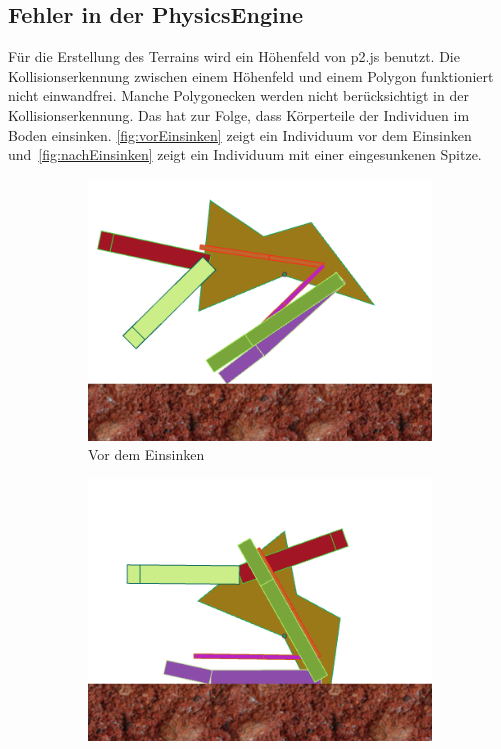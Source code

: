     \subsection{Fehler in der \gls{PhysicsEngine}}

      Für die Erstellung des Terrains wird ein Höhenfeld von p2.js benutzt.
      Die Kollisionserkennung zwischen einem Höhenfeld und einem Polygon funktioniert nicht einwandfrei.
      Manche Polygonecken werden nicht berücksichtigt in der Kollisionserkennung.
      Das hat zur Folge, dass Körperteile der Individuen im Boden einsinken.
      \vref{fig:vorEinsinken} zeigt ein Individuum vor dem Einsinken
      und~\vref{fig:nachEinsinken} zeigt ein Individuum mit einer eingesunkenen Spitze.

      \begin{figure}[H]
        \centering
        \begin{subfigure}[b]{0.45\textwidth}
          \includegraphics[width=\linewidth,center]{graphics/physics-engine/sink-0}
          \caption{Vor dem Einsinken\label{fig:vorEinsinken}}
        \end{subfigure}
        \qquad
        \begin{subfigure}[b]{0.45\textwidth}
          \includegraphics[width=\linewidth,center]{graphics/physics-engine/sink-1}

\end{subfigure}
\end{figure}
